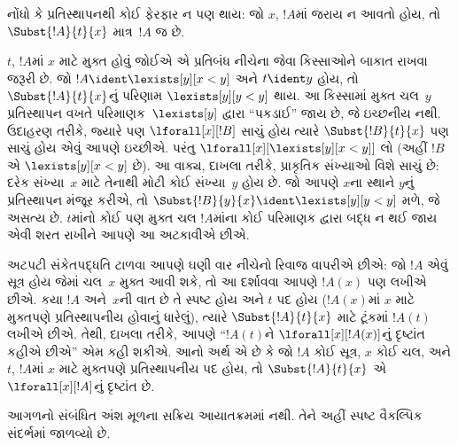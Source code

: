 \begin{explain}
નોંધો કે પ્રતિસ્થાપનથી કોઈ ફેરફાર ન પણ થાય: જો $x$, $!A$માં
જરાય ન આવતો હોય, તો $\Subst{!A}{t}{x}$ માત્ર~$!A$ જ છે.

$t$, $!A$માં $x$ માટે મુક્ત હોવું જોઈએ એ પ્રતિબંધ નીચેના
જેવા કિસ્સાઓને બાકાત રાખવા જરૂરી છે. જો
$!A \ident \lexists[y][x < y]$ અને $t \ident y$ હોય, તો
$\Subst{!A}{t}{x}$નું પરિણામ $\lexists[y][y < y]$ થાય. આ કિસ્સામાં
મુક્ત ચલ~$y$ પ્રતિસ્થાપન વખતે પરિમાણક~$\lexists[y]$ દ્વારા
``પકડાઈ'' જાય છે, જે ઇચ્છનીય નથી. ઉદાહરણ તરીકે, જ્યારે પણ
$\lforall[x][!B]$ સાચું હોય ત્યારે $\Subst{!B}{t}{x}$ પણ સાચું હોય
એવું આપણે ઇચ્છીએ. પરંતુ $\lforall[x][\lexists[y][x < y]]$ લો
(અહીં $!B$ એ $\lexists[y][x < y]$ છે). આ વાક્ય, દાખલા તરીકે,
પ્રાકૃતિક સંખ્યાઓ વિશે સાચું છે: દરેક સંખ્યા~$x$ માટે તેનાથી મોટી
કોઈ સંખ્યા~$y$ હોય છે. જો આપણે $x$ના સ્થાને $y$નું પ્રતિસ્થાપન
મંજૂર કરીએ, તો $\Subst{!B}{y}{x} \ident \lexists[y][y < y]$ મળે,
જે અસત્ય છે. $t$માંનો કોઈ પણ મુક્ત ચલ $!A$માંના કોઈ પરિમાણક દ્વારા
બદ્ધ ન થઈ જાય એવી શરત રાખીને આપણે આ અટકાવીએ છીએ.
\end{explain}

અટપટી સંકેતપદ્ધતિ ટાળવા આપણે ઘણી વાર નીચેનો રિવાજ વાપરીએ છીએ: જો
$!A$ એવું સૂત્ર હોય જેમાં ચલ~$x$ મુક્ત આવી શકે, તો
આ દર્શાવવા આપણે $!A(x)$ પણ લખીએ છીએ. કયા $!A$ અને~$x$ની વાત છે તે
સ્પષ્ટ હોય અને $t$ પદ હોય ($!A(x)$માં $x$ માટે મુક્તપણે
પ્રતિસ્થાપનીય હોવાનું ધારેલું), ત્યારે $\Subst{!A}{t}{x}$ માટે ટૂંકમાં
$!A(t)$ લખીએ છીએ. તેથી, દાખલા તરીકે, આપણે ``$!A(t)$ને
$\lforall[x][!A(x)]$નું દૃષ્ટાંત
કહીએ છીએ'' એમ કહી શકીએ. આનો અર્થ એ છે કે જો $!A$ કોઈ સૂત્ર,
$x$ કોઈ ચલ, અને $t$, $!A$માં $x$ માટે મુક્તપણે
પ્રતિસ્થાપનીય પદ હોય, તો $\Subst{!A}{t}{x}$ એ
$\lforall[x][!A]$નું દૃષ્ટાંત છે.
\endgroup


\OLEndChapterHook


\begin{editorial}
આગળનો સંબંધિત અંશ મૂળના સક્રિય આયાતક્રમમાં નથી. તેને અહીં સ્પષ્ટ વૈકલ્પિક સંદર્ભમાં જાળવ્યો છે.
\end{editorial}
\begingroup
\makeatletter{}\makeatother

\label{guunit:OLP-0646}


\begingroup
\makeatletter{}\makeatother


\label{guunit:OLP-0645}


